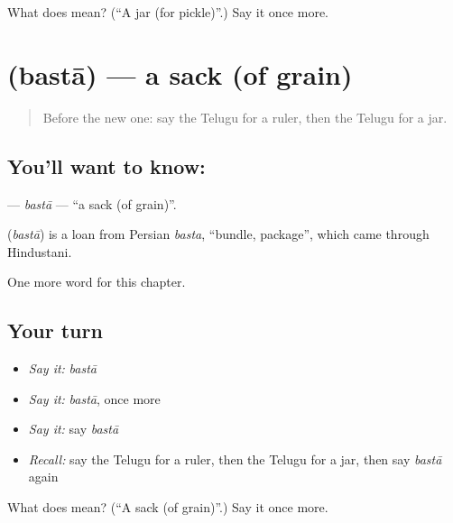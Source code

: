 \begin{tcolorbox}[breakable,colback=teal!4,colframe=teal!35!black,title={Before you move on}]
What does  mean? (\textquotedblleft{}A jar (for pickle)\textquotedblright{}.) Say it once more.
\end{tcolorbox}
\section[\texorpdfstring{\te{బస్తా} (bastā)}{బస్తా (bastā)}]{ (bastā) — a sack (of grain)}

\label{lesson:TE-C232-basta}



\begin{quote}
Before the new one: say the Telugu for a ruler, then the Telugu for a jar.
\end{quote}

\subsection*{You'll want to know: }
\textbf{} — \emph{bastā} — \textquotedblleft{}a sack (of grain)\textquotedblright{}.

\begin{cousinweb}
\textbf{} (\emph{bastā}) is a loan from Persian \emph{basta}, \textquotedblleft{}bundle, package\textquotedblright{}, which came through Hindustani.
\end{cousinweb}

\begin{grammarlens}[title={What you've built}]
One more word for this chapter.
\end{grammarlens}

\subsection*{Your turn}
\begin{itemize}
\raggedright
  \item \emph{Say it:} \emph{bastā}
  \item \emph{Say it:} \emph{bastā}, once more
  \item \emph{Say it:} say \emph{bastā}
  \item \emph{Recall:} say the Telugu for a ruler, then the Telugu for a jar, then say \emph{bastā} again
\end{itemize}

\begin{tcolorbox}[breakable,colback=teal!4,colframe=teal!35!black,title={Before you move on}]
What does  mean? (\textquotedblleft{}A sack (of grain)\textquotedblright{}.) Say it once more.
\end{tcolorbox}

